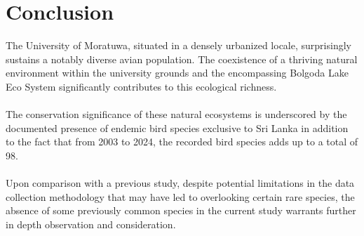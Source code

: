 \chapter{Conclusion}

The University of Moratuwa, situated in a densely urbanized locale, surprisingly sustains a notably diverse avian population. The coexistence of a thriving natural environment within the university grounds and the encompassing Bolgoda Lake Eco System significantly contributes to this ecological richness.
\\\\
The conservation significance of these natural ecosystems is underscored by the documented presence of endemic bird species exclusive to Sri Lanka in addition to the fact that from 2003 to 2024, the recorded bird species adds up to a total of 98.
\\\\
Upon comparison with a previous study, despite potential limitations in the data collection methodology that may have led to overlooking certain rare species, the absence of some previously common species in the current study warrants further in depth observation and consideration. 